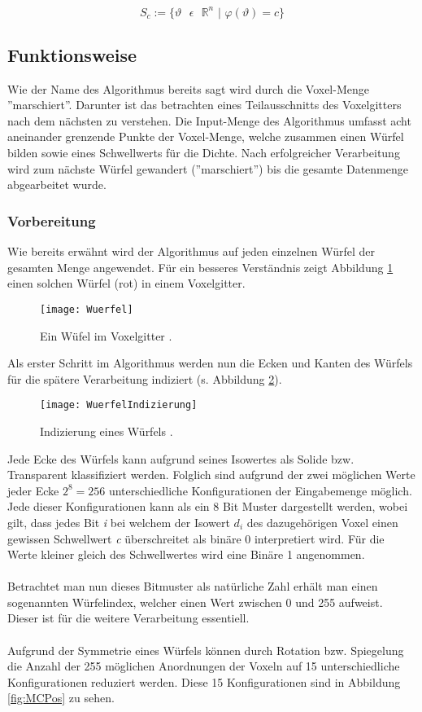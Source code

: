 \begin{equation}
\label{mat:isoDef}
S_{c} := \{ \vartheta \text{ } \epsilon \text{ } \mathbb{R}^{n} \text{ | } \varphi(\vartheta) = c\}
\end{equation} 
\subsection{Funktionsweise}

Wie der Name des Algorithmus bereits sagt wird durch die Voxel-Menge ''marschiert''. Darunter ist das betrachten eines Teilausschnitts des Voxelgitters nach dem nächsten zu verstehen. Die Input-Menge des Algorithmus umfasst acht aneinander grenzende Punkte der Voxel-Menge, welche zusammen einen Würfel bilden sowie eines Schwellwerts für die Dichte. Nach erfolgreicher Verarbeitung wird zum nächste Würfel gewandert (''marschiert'') bis die gesamte Datenmenge abgearbeitet wurde.
\subsubsection{Vorbereitung}
Wie bereits erwähnt wird der Algorithmus auf jeden einzelnen Würfel der gesamten Menge angewendet. Für ein besseres Verständnis zeigt Abbildung \ref{fig:Wuerfel} einen solchen Würfel (rot) in einem Voxelgitter.
\begin{figure}[H]
	\centering
	\texttt{[image: Wuerfel]}
	\caption{Ein Wüfel im Voxelgitter \citep{SeibtBak}.}
	\label{fig:Wuerfel}
\end{figure}
\noindent Als erster Schritt im Algorithmus werden nun die Ecken und Kanten des Würfels für die spätere Verarbeitung indiziert (s. Abbildung \ref{fig:WuerfelIndizierung}).
\begin{figure}[H]
	\centering
	\texttt{[image: WuerfelIndizierung]}
	\caption{Indizierung eines Würfels \citep{SeibtBak}.}
	\label{fig:WuerfelIndizierung}
\end{figure}

\noindent Jede Ecke des Würfels kann aufgrund seines Isowertes als Solide bzw. Transparent klassifiziert werden. Folglich sind aufgrund der zwei möglichen Werte jeder Ecke $2^{8} = 256$ unterschiedliche Konfigurationen der Eingabemenge möglich. Jede dieser Konfigurationen kann als ein 8 Bit Muster dargestellt werden, wobei gilt, dass jedes Bit \textit{i} bei welchem der Isowert \textit{$d_{i}$} des dazugehörigen Voxel einen gewissen Schwellwert \textit{c} überschreitet als binäre 0 interpretiert wird. Für die Werte kleiner gleich des Schwellwertes wird eine Binäre 1 angenommen.\\
\\ 
Betrachtet man nun dieses Bitmuster als natürliche Zahl erhält man einen sogenannten Würfelindex, welcher einen Wert zwischen 0  und 255 aufweist. Dieser ist für die weitere Verarbeitung essentiell.\\
\\
Aufgrund der Symmetrie eines Würfels können durch Rotation bzw. Spiegelung die Anzahl der 255 möglichen Anordnungen der Voxeln auf 15 unterschiedliche Konfigurationen reduziert werden. Diese 15 Konfigurationen sind in Abbildung \ref{fig:MCPos} zu sehen.

